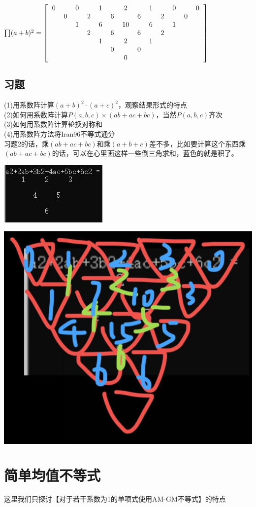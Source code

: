 \documentclass[UTF8]{ctexart}
\begin{document}
$\prod (a+b)^{2}=
\left[\begin{matrix}
	\begin{tabular}{ccccccccccccc}
		0& &0& &1& &2& &1& &0& &0\\
		&0& &2& &6& &6& &2& &0&\\
		& &1& &6& &10& &6& &1& &\\
		& & &2& &6& &6& &2& & &\\
		& & & &1& &2& &1& & & &\\
		& & & & &0& &0& & & & &\\
		& & & & & &0& & & & & &\\
	\end{tabular}
\end{matrix}\right] $
\subsection{习题}
\noindent (1)用系数阵计算$ (a+b)^{2}·(a+c)^{2} $，观察结果形式的特点\\
(2)如何用系数阵计算$ P(a,b,c)×(ab+ac+bc) $，当然$ P(a,b,c) $齐次\\
(3)如何用系数阵计算轮换对称和\\
(4)用系数阵方法将Iran96不等式通分\\
习题2的话，乘$ (ab+ac+bc) $和乘$ (a+b+c) $差不多，比如要计算这个东西乘$ (ab+ac+bc) $的话，可以在心里画这样一些倒三角求和，蓝色的就是积了。
\begin{center}
	\includegraphics[width=0.35\linewidth]{10}
\end{center}
\begin{center}
	\includegraphics[width=0.35\linewidth]{11}
\end{center}
\section{简单均值不等式}
这里我们只探讨【对于若干系数为1的单项式使用AM-GM不等式】的特点
\end{document}
